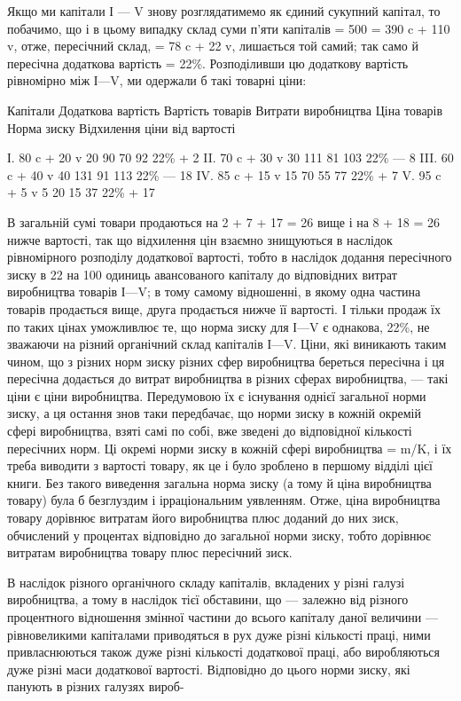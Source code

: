 Якщо ми капітали І — V знову розглядатимемо як єдиний сукупний капітал, то побачимо, що і в цьому
випадку склад суми
п’яти капіталів = 500 = 390 c + 110 v, отже, пересічний склад, = 78 c + 22 v, лишається той самий;
так само й пересічна додаткова вартість = 22\%. Розподіливши цю додаткову вартість рівномірно між
І—V, ми одержали б такі товарні ціни:

Капітали
Додаткова вартість
Вартість товарів
Витрати виробництва
Ціна товарів
Норма зиску
Відхилення ціни від вартості

І. 80 c + 20 v    20    90    70    92    22\%    + 2
II. 70 c + 30 v   30   111   81   103   22\%  — 8
III. 60 c + 40 v  40   131   91   113   22\% — 18
IV. 85 c + 15 v   15    70    55    77    22\%    + 7
V. 95 c + 5 v        5     20    15    37    22\%  + 17

В загальній сумі товари продаються на 2 + 7 + 17 = 26 вище і
на 8 + 18 = 26 нижче вартості, так що відхилення цін взаємно
знищуються в наслідок рівномірного розподілу додаткової вартості, тобто в наслідок додання
пересічного зиску в 22 на
100 одиниць авансованого капіталу до відповідних витрат виробництва товарів І—V; в тому самому
відношенні, в якому одна
частина товарів продається вище, друга продається нижче її
вартості. І тільки продаж їх по таких цінах уможливлює те, що
норма зиску для І—V є однакова, 22\%, не зважаючи на різний
органічний склад капіталів І—V. Ціни, які виникають таким чином, що з різних норм зиску різних сфер
виробництва береться
пересічна і ця пересічна додається до витрат виробництва в різних сферах виробництва, — такі ціни є
ціни виробництва. Передумовою їх є існування однієї загальної норми зиску, а ця
остання знов таки передбачає, що норми зиску в кожній окремій сфері виробництва, взяті самі по собі,
вже зведені до
відповідної кількості пересічних норм. Ці окремі норми зиску в кожній сфері виробництва = m/K, і їх
треба виводити з вартості товару, як це і було зроблено в першому відділі цієї книги. Без такого
виведення загальна норма зиску (а тому й ціна виробництва товару) була б безглуздим і ірраціональним
уявленням. Отже, ціна виробництва товару дорівнює витратам його
виробництва плюс доданий до них зиск, обчислений у процентах
відповідно до загальної норми зиску, тобто дорівнює витратам
виробництва товару плюс пересічний зиск.

В наслідок різного органічного складу капіталів, вкладених
у різні галузі виробництва, а тому в наслідок тієї обставини,
що — залежно від різного процентного відношення змінної частини до всього капіталу даної величини —
рівновеликими капіталами приводяться в рух дуже різні кількості праці, ними привласнюються також
дуже різні кількості додаткової праці, або
виробляються дуже різні маси додаткової вартості. Відповідно
до цього норми зиску, які панують в різних галузях вироб-
